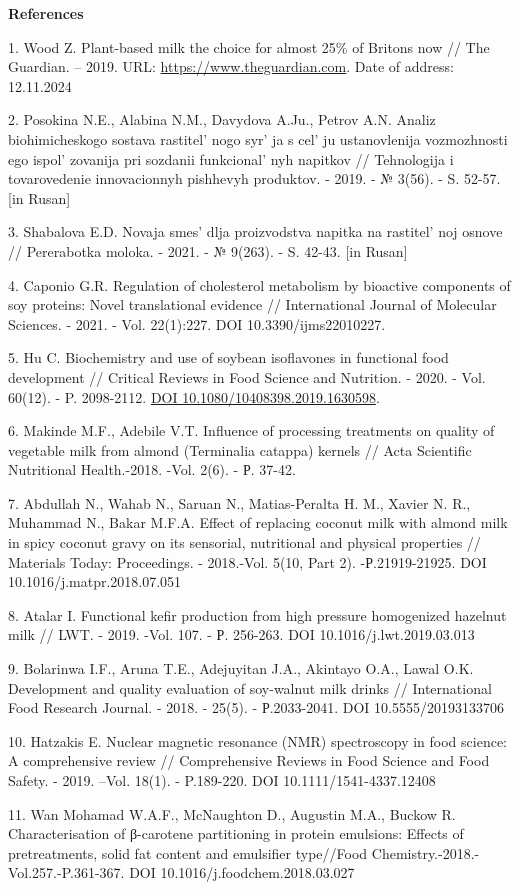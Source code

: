 \begin{center}
{\bfseries References}
\end{center}

\begin{references}
1. Wood Z. Plant-based milk the choice for almost 25\% of Britons now //
The Guardian. -- 2019. URL:
\href{https://www.theguardian.com/food/2019/jul/19/plant-based-milk-the-choice-for-almost-25-of-britons-now}{https://www.theguardian.com}.
Date of address: 12.11.2024

2. Posokina N.E., Alabina N.M., Davydova A.Ju., Petrov A.N. Analiz
biohimicheskogo sostava rastitel' nogo
syr' ja s cel' ju ustanovlenija
vozmozhnosti ego ispol' zovanija pri sozdanii
funkcional' nyh napitkov // Tehnologija i tovarovedenie
innovacionnyh pishhevyh produktov. - 2019. - № 3(56). - S. 52-57. {[}in
Rusan{]}

3. Shabalova E.D. Novaja smes'{} dlja proizvodstva
napitka na rastitel' noj osnove // Pererabotka moloka. -
2021. - № 9(263). - S. 42-43. {[}in Rusan{]}

4. Caponio G.R. Regulation of cholesterol metabolism by bioactive
components of soy proteins: Novel translational evidence //
International Journal of Molecular Sciences. - 2021. - Vol. 22(1):227.
DOI 10.3390/ijms22010227.

5. Hu C. Biochemistry and use of soybean isoflavones in functional food
development // Critical Reviews in Food Science and Nutrition. - 2020. -
Vol. 60(12). - P. 2098-2112.
\href{https://doi.org/10.1080/10408398.2019.1630598}{DOI
10.1080/10408398.2019.1630598}.

6. Makinde M.F., Adebile V.T. Influence of processing treatments on
quality of vegetable milk from almond (Terminalia catappa) kernels //
Acta Scientific Nutritional Health.-2018. -Vol. 2(6). - Р. 37-42.

7. Abdullah N., Wahab N., Saruan N., Matias-Peralta H. M., Xavier N. R.,
Muhammad N., Bakar M.F.A. Effect of replacing coconut milk with almond
milk in spicy coconut gravy on its sensorial, nutritional and physical
properties // Materials Today: Proceedings. - 2018.-Vol. 5(10, Part 2).
-Р.21919-21925. DOI 10.1016/j.matpr.2018.07.051

8. Atalar I. Functional kefir production from high pressure homogenized
hazelnut milk // LWT. - 2019. -Vol. 107. - Р. 256-263. DOI
10.1016/j.lwt.2019.03.013

9. Bolarinwa I.F., Aruna T.E., Adejuyitan J.A., Akintayo O.A., Lawal
O.K. Development and quality evaluation of soy-walnut milk drinks //
International Food Research Journal. - 2018. - 25(5). - Р.2033-2041. DOI
10.5555/20193133706

10. Hatzakis E. Nuclear magnetic resonance (NMR) spectroscopy in food
science: A comprehensive review // Comprehensive Reviews in Food Science
and Food Safety. - 2019. --Vol. 18(1). - P.189-220. DOI
10.1111/1541-4337.12408

11. Wan Mohamad W.A.F., McNaughton D., Augustin M.A., Buckow R.
Characterisation of β-carotene partitioning in protein emulsions:
Effects of pretreatments, solid fat content and emulsifier type//Food
Chemistry.-2018.-Vol.257.-P.361-367. DOI 10.1016/j.foodchem.2018.03.027
\end{references}


